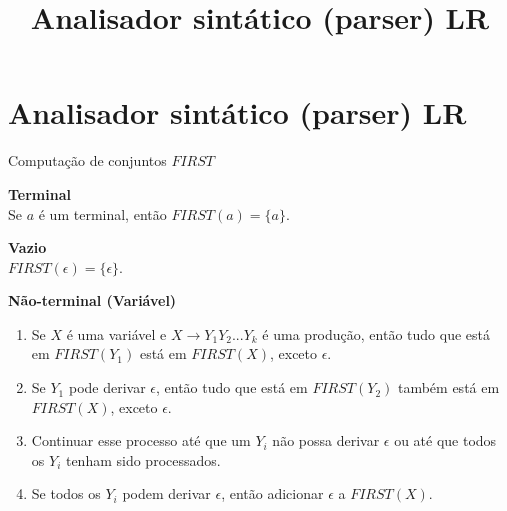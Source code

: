 \title{Analisador sintático (parser) LR}
\section{Analisador sintático (parser) LR}

\frame{\maketitle}

\begin{frame}{Computação de conjuntos $FIRST$}

{\bf Terminal}\\
Se $a$ é um terminal, então $FIRST(a) = \{a\}$.\bigskip

{\bf Vazio}\\
$FIRST(\epsilon) = \{\epsilon\}$.\bigskip

{\bf Não-terminal (Variável)}\\
\begin{enumerate}
 \item Se $X$ é uma variável e $X \rightarrow Y_1 Y_2 ... Y_k$ é uma produção, 
      então tudo que está em $FIRST(Y_1)$ está em $FIRST(X)$, exceto $\epsilon$. 
 \item Se $Y_1$ pode derivar $\epsilon$, então tudo que está em $FIRST(Y_2)$ 
       também está em $FIRST(X)$, exceto $\epsilon$. 
\item Continuar esse processo até que um $Y_i$ não possa 
      derivar $\epsilon$ ou até que todos os $Y_i$ tenham sido processados. 
\item Se todos os $Y_i$ podem derivar $\epsilon$, então adicionar $\epsilon$ a $FIRST(X)$.
\end{enumerate}

\end{frame}

